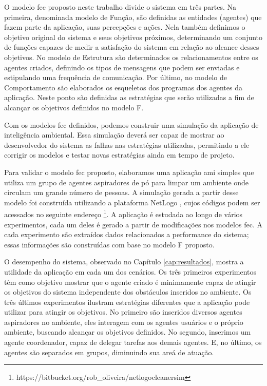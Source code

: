     O modelo \acrshort{fec} proposto neste trabalho divide o sistema em três partes. Na primeira, denominada modelo de Função, são definidas as entidades (agentes) que fazem parte da aplicação, suas percepções e ações. Nela também definimos o objetivo original do sistema e seus objetivos próximos, determinando um conjunto de funções capazes de medir a satisfação do sistema em relação ao alcance desses objetivos. No modelo de Estrutura são determinados os relacionamentos entre os agentes criados, definindo os tipos de mensagens que podem ser enviadas e estipulando uma frequência de comunicação. Por último, no modelo de Comportamento são elaborados os esqueletos dos programas dos agentes da aplicação. Neste ponto são definidas as estratégias que serão utilizadas a fim de alcançar os objetivos definidos no modelo F. 
    
    Com os modelos \acrshort{fec} definidos, podemos construir uma simulação da aplicação de inteligência ambiental. Essa simulação deverá ser capaz de mostrar ao desenvolvedor do sistema as falhas nas estratégias utilizadas, permitindo a ele corrigir os modelos e testar novas estratégias ainda em tempo de projeto.  
    
    Para validar o modelo \acrshort{fec} proposto, elaboramos uma aplicação \acrshort{ami} simples que utiliza um grupo de agentes aspiradores de pó para limpar um ambiente onde circulam um grande número de pessoas. A simulação gerada a partir desse modelo foi construída utilizando a plataforma NetLogo \cite{wilensky1999netlogo}, cujos códigos podem ser acessados no seguinte endereço \footnote{https://bitbucket.org/rob\_oliveira/netlogocleanersim}. A aplicação é estudada ao longo de vários experimentos, cada um deles é gerado a partir de modificações nos modelos \acrshort{fec}. A cada experimento são extraídos dados relacionados a performance do sistema; essas informações são construídas com base no modelo F proposto. 
    
    O desempenho do sistema, observado no Capítulo \ref{cap:resultados}, mostra a utilidade da aplicação em cada um dos cenários. Os três primeiros experimentos têm como objetivo mostrar que o agente criado é minimamente capaz de atingir os objetivos do sistema independente dos obstáculos inseridos no ambiente. Os três últimos experimentos ilustram estratégias diferentes que a aplicação pode utilizar para atingir os objetivos. No primeiro são inseridos diversos agentes aspiradores no ambiente, eles interagem com os agentes usuários e o próprio ambiente, buscando alcançar os objetivos definidos. No segundo, inserimos um agente coordenador, capaz de delegar tarefas aos demais agentes. E, no último, os agentes são separados em grupos, diminuindo sua areá de atuação. 
    
